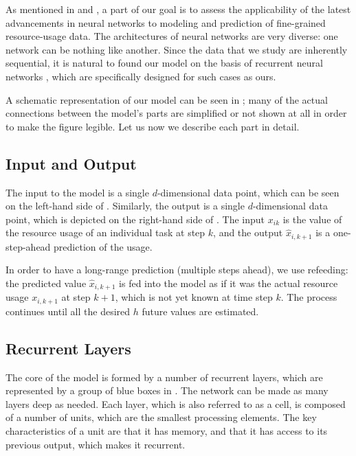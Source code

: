 
As mentioned in  and , a part of our goal is to
assess the applicability of the latest advancements in neural networks
\cite{goodfellow2016} to modeling and prediction of fine-grained resource-usage
data. The architectures of neural networks are very diverse: one network can be
nothing like another. Since the data that we study are inherently sequential, it
is natural to found our model on the basis of recurrent neural networks
\cite{goodfellow2016}, which are specifically designed for such cases as ours.

A schematic representation of our model can be seen in ; many of the
actual connections between the model's parts are simplified or not shown at all
in order to make the figure legible. Let us now we describe each part in detail.

\subsection{Input and Output}
The input to the model is a single $d$-dimensional data point, which can be seen
on the left-hand side of . Similarly, the output is a single
$d$-dimensional data point, which is depicted on the right-hand side of
. The input $x_{ik}$ is the value of the resource usage of an
individual task at step $k$, and the output $\hat{x}_{i,k + 1}$ is a
one-step-ahead prediction of the usage.

In order to have a long-range prediction (multiple steps ahead), we use
refeeding: the predicted value $\hat{x}_{i,k + 1}$ is fed into the model as if
it was the actual resource usage $x_{i,k + 1}$ at step $k + 1$, which is not
yet known at time step $k$. The process continues until all the desired $h$
future values are estimated.

\subsection{Recurrent Layers} 
The core of the model is formed by a number of recurrent layers, which are
represented by a group of blue boxes in . The network can be made as
many layers deep as needed. Each layer, which is also referred to as a cell, is
composed of a number of units, which are the smallest processing elements. The
key characteristics of a unit are that it has memory, and that it has access to
its previous output, which makes it recurrent.

